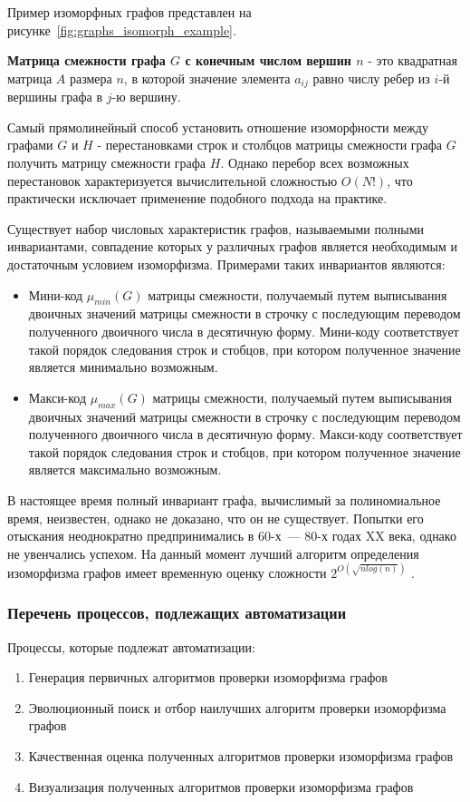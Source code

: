 \documentclass[russian,utf8,emptystyle]{eskdtext}
\begin{document}
\begin{spacing}{1.5}
Пример изоморфных графов представлен на рисунке~\ref{fig:graphs_isomorph_example}.

\textbf{Матрица смежности графа $G$ с конечным числом вершин $n$} - это квадратная матрица $A$ размера $n$, в которой значение элемента $a_{ij}$ равно числу ребер из $i$-й вершины графа в $j$-ю вершину. 

Самый прямолинейный способ установить отношение изоморфности между графами $G$ и $H$ - перестановками строк и столбцов матрицы смежности графа $G$ получить матрицу смежности графа $H$. Однако перебор всех возможных перестановок характеризуется вычислительной сложностью $O(N!)$, что практически исключает применение подобного подхода на практике.

Существует набор числовых характеристик графов, называемыми полными инвариантами\cite{Zukov}, совпадение которых у различных графов является необходимым и достаточным условием изоморфизма. Примерами таких инвариантов являются:
\begin{itemize}
\item Мини-код $\mu_{min}(G)$ матрицы смежности, получаемый путем выписывания двоичных значений матрицы смежности в строчку с последующим переводом полученного двоичного числа в десятичную форму. Мини-коду соответствует такой порядок следования строк и стобцов, при котором полученное значение является минимально возможным.
\item Макси-код $\mu_{max}(G)$ матрицы смежности, получаемый путем выписывания двоичных значений матрицы смежности в строчку с последующим переводом полученного двоичного числа в десятичную форму. Макси-коду соответствует такой порядок следования строк и стобцов, при котором полученное значение является максимально возможным.
\end{itemize}

В настоящее время полный инвариант графа, вычислимый за полиномиальное время, неизвестен, однако не доказано, что он не существует. Попытки его отыскания неоднократно предпринимались в 60-х~--- 80-х годах XX века, однако не увенчались успехом. На данный момент лучший алгоритм определения изоморфизма графов имеет временную оценку сложности $2^{O(\sqrt{n log(n)})}$ \cite{Johnson2005} \cite{BabaiCodenotti2008}.

\subsubsection{Перечень процессов, подлежащих автоматизации}
Процессы, которые подлежат автоматизации:
\begin{enumerate}
\item Генерация первичных алгоритмов проверки изоморфизма графов
\item Эволюционный поиск и отбор наилучших алгоритм проверки изоморфизма графов
\item Качественная оценка полученных алгоритмов проверки изоморфизма графов
\item Визуализация полученных алгоритмов проверки изоморфизма графов
\end{enumerate}


\end{spacing}
\end{document}
